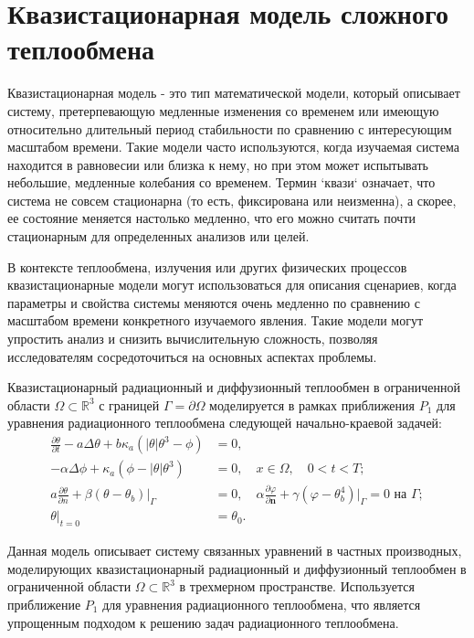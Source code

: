 \section{Квазистационарная модель сложного теплообмена}
\label{sec:ch1/sec4}
Квазистационарная модель - это тип математической модели,
который описывает систему, претерпевающую медленные изменения
со временем или имеющую относительно длительный период стабильности
по сравнению с интересующим масштабом времени.
Такие модели часто используются, когда изучаемая система находится
в равновесии или близка к нему, но при этом может испытывать небольшие,
медленные колебания со временем.
Термин `квази` означает,
что система не совсем стационарна (то есть, фиксирована или неизменна),
а скорее, ее состояние меняется настолько медленно, что его можно считать
почти стационарным для определенных анализов или целей.

В контексте теплообмена, излучения или других физических процессов
квазистационарные модели могут использоваться для описания сценариев,
когда параметры и свойства системы меняются очень медленно по сравнению
с масштабом времени конкретного изучаемого явления.
Такие модели могут упростить анализ и снизить вычислительную сложность,
позволяя исследователям сосредоточиться на основных аспектах проблемы.


Квазистационарный радиационный и диффузионный теплообмен в ограниченной
области $\Omega \subset \mathbb{R}^3$ с границей
$\Gamma = \partial\Omega$ моделируется в рамках приближения $P_1$
для уравнения радиационного теплообмена следующей
начально-краевой задачей:
\begin{align}
    \frac{\partial\theta}{\partial t} - a\Delta\theta
    + b\kappa_a (|\theta|\theta^3 - \phi) &= 0, \label{eq:1_5:1}\\
    - \alpha\Delta\phi + \kappa_a (\phi - |\theta|\theta^3 ) &= 0,
    \quad x \in \Omega, \quad 0 < t < T ; \label{eq:1_5:1+} \\
    a \frac{\partial \theta}{\partial n}
    +\left.\beta\left(\theta-\theta_{b}\right)\right|_{\Gamma}&=0,
    \quad \alpha \frac{\partial \varphi}{\partial \mathbf{n}} + \gamma
    (\varphi-\theta_b^4)|_{\Gamma} = 0 \text{ на } \Gamma; \label{eq:1_5:2} \\
    \theta|_{t=0} &= \theta_0. \label{eq:1_5:3}
\end{align}

Данная модель описывает систему связанных уравнений в частных производных,
моделирующих квазистационарный радиационный и диффузионный теплообмен в
ограниченной области $\Omega \subset \mathbb{R}^3$ в трехмерном пространстве.
Используется приближение $P_1$ для уравнения радиационного теплообмена,
что является упрощенным подходом к решению задач радиационного теплообмена.

